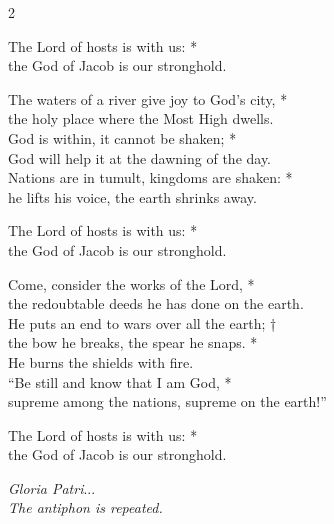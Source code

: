 \begin{multicols}{2}

    
    The Lord of hosts is with us: *\\
    the God of Jacob is our stronghold.
    
    The waters of a river give joy to God’s city, *\\
    the holy place where the Most High dwells.\\
    God is within, it cannot be shaken; *\\
    God will help it at the dawning of the day.\\
    Nations are in tumult, kingdoms are shaken: *\\
    he lifts his voice, the earth shrinks away.
    
    The Lord of hosts is with us: *\\
    the God of Jacob is our stronghold.
    
    Come, consider the works of the Lord, *\\
    the redoubtable deeds he has done on the earth.\\
    He puts an end to wars over all the earth; †\\
    the bow he breaks, the spear he snaps. *\\
    He burns the shields with fire.\\
    “Be still and know that I am God, *\\
    supreme among the nations, supreme on the earth!”
    
    The Lord of hosts is with us: *\\
    the God of Jacob is our stronghold.   

    \emph{Gloria Patri}...\\
    \emph{The antiphon is repeated.}
\end{multicols}
